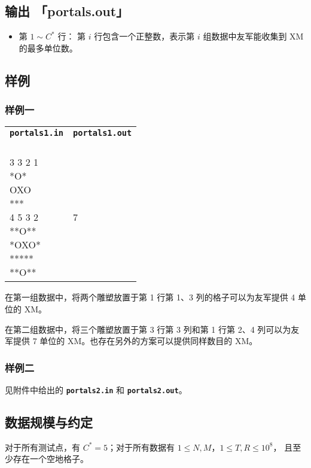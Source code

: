\documentclass[UTF8, 11pt, a4paper]{article}
\begin{document}
\subsection*{输出 \makebox[0.5em]{} \small{「portals.out」}}
\begin{itemize}
    \item 第 $1 \sim C^*$ 行：%
        第 $i$ 行包含一个正整数，表示第 $i$ 组数据中友军能收集到 XM 的最多单位数。
\end{itemize}
\newpage

\subsection*{样例}
\subsubsection*{样例一}
\begin{table}[h]\centering
\begin{tabularx}{0.8 \textwidth}{|X|X|}
\hline
\texttt{\textbf{portals1.in}} & \texttt{\textbf{portals1.out}} \\ \hline
{\ttfamily
2\newline
3 3 2 1\newline
*O*\newline
OXO\newline
***\newline
4 5 3 2\newline
**O**\newline
*OXO*\newline
*****\newline
**O**
} & {\ttfamily
4\newline
7
}
\\ \hline
\end{tabularx}\end{table}

在第一组数据中，将两个雕塑放置于第 1 行第 1、3 列的格子可以为友军提供 4 单位的 XM。

在第二组数据中，将三个雕塑放置于第 3 行第 3 列和第 1 行第 2、4 列可以为友军提供 %
7 单位的 XM。也存在另外的方案可以提供同样数目的 XM。

\subsubsection*{样例二}
见附件中给出的 \texttt{\textbf{portals2.in}} 和 \texttt{\textbf{portals2.out}}。

\subsection*{数据规模与约定}
对于所有测试点，有 $C^* = 5$；对于所有数据有 $1 \leq N, M$，$1 \leq T, R \leq 10^8$，%
且至少存在一个空地格子。
\end{document}
